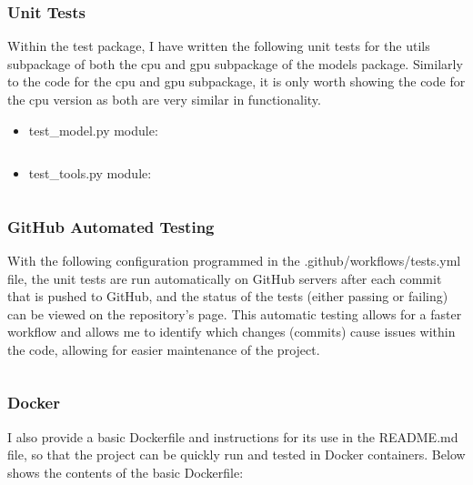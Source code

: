 \documentclass[./project-report/src/latex/project-report.tex]{subfiles}
\begin{document}
\subsubsection{Unit Tests}
\label{sec:unit-tests}

Within the test package, I have written the following unit tests for the utils subpackage of both the cpu and gpu subpackage of the models package. Similarly to the code for the cpu 
and gpu subpackage, it is only worth showing the code for the cpu version as both are very similar in functionality.

\begin{itemize}
    \item test\_model.py module:
        \inputminted{python}{./school_project/test/models/cpu/utils/test_model.py}

        \pagebreak

    \item test\_tools.py module:
        \inputminted{python}{./school_project/test/models/cpu/utils/test_tools.py}
\end{itemize}

\subsubsection{GitHub Automated Testing}

With the following configuration programmed in the .github/workflows/tests.yml file, the unit tests are run automatically on GitHub servers after each commit that is pushed to GitHub, 
and the status of the tests (either passing or failing) can be viewed on the repository's page. This automatic testing allows for a faster workflow and allows me to identify which changes 
(commits) cause issues within the code, allowing for easier maintenance of the project.

\inputminted{yaml}{./.github/workflows/tests.yml}

\subsubsection{Docker}

I also provide a basic Dockerfile and instructions for its use in the README.md file, so that the project can be quickly run and tested in Docker containers. Below 
shows the contents of the basic Dockerfile:

\inputminted{docker}{./Dockerfile}
\end{document}
